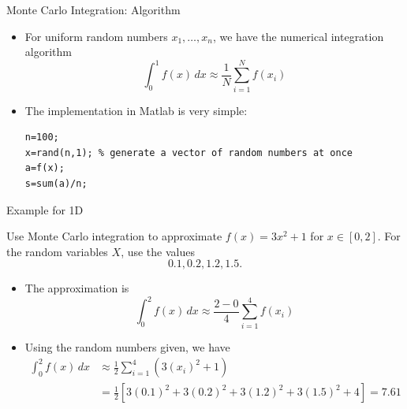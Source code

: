 \documentclass[10pt]{beamer}
\begin{document}
\begin{frame}[fragile]{Monte Carlo Integration: Algorithm}
\begin{itemize}
    \item For uniform random numbers $x_1,\dots,x_n$, we have the numerical integration algorithm
\begin{equation*}
  \int_0^1 f(x)\,dx \approx \frac{1}{N} \sum_{i=1}^{N} f(x_i)  
\end{equation*}

\item The implementation in Matlab is very simple:
\begin{lstlisting}[mathescape]
n=100;
x=rand(n,1); % generate a vector of random numbers at once
a=f(x);
s=sum(a)/n;
\end{lstlisting}
\bigskip


\end{itemize}
\end{frame}
\begin{frame}{Example for 1D}
\begin{example}
    Use Monte Carlo integration to approximate $f(x)=3x^2+1$ for $x\in[0,2]$. For the random variables $X$, use the values 
    $$ 0.1, 0.2, 1.2, 1.5.$$
\end{example}
\begin{itemize}
    \item  The approximation is 
        $$\int_0^2 f(x)\,dx \approx \frac{2-0}{4} \sum_{i=1}^4 f(x_i)$$
    \item Using the random numbers given, we have 
        \begin{align*}
            \int_0^2 f(x)\,dx &\approx \frac{1}{2} \sum_{i=1}^4 (3(x_i)^2 + 1)\\
                &=\frac{1}{2} \left[ 3(0.1)^2 + 3(0.2)^2 + 3(1.2)^2 + 3(1.5)^2 + 4  \right] = 7.61
        \end{align*}
\end{itemize}


\end{frame}
\end{document}
